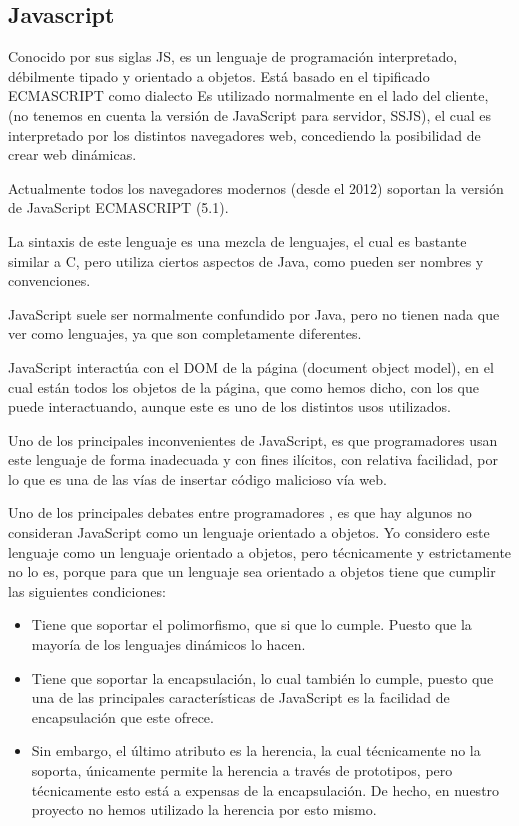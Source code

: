 \subsection{Javascript}

Conocido por sus siglas JS, es un lenguaje de programación interpretado, débilmente tipado y orientado a objetos. Está basado en el tipificado ECMASCRIPT como dialecto
Es utilizado normalmente en el lado del cliente, (no tenemos en cuenta la versión de JavaScript para servidor, SSJS), el cual es interpretado por los distintos navegadores web, concediendo la posibilidad de crear web dinámicas.\cite{JS}

Actualmente todos los navegadores modernos (desde el 2012) soportan la versión de JavaScript ECMASCRIPT (5.1)\cite{ES}.

La sintaxis de este lenguaje es una mezcla de lenguajes, el cual es bastante similar a C, pero utiliza ciertos aspectos de Java, como pueden ser nombres y convenciones.

JavaScript suele ser normalmente confundido por Java, pero no tienen nada que ver como lenguajes, ya que son completamente diferentes.

JavaScript interactúa con el DOM de la página (document object model), en el cual están todos los objetos de la página, que como hemos dicho, con los que puede interactuando, aunque este es uno de los distintos usos utilizados.

Uno de los principales inconvenientes de JavaScript, es que programadores usan este lenguaje de forma inadecuada y con fines ilícitos, con relativa facilidad, por lo que es una de las vías de insertar código malicioso vía web.


Uno de los principales debates entre programadores \cite{JS_OOD}, es que hay algunos no consideran JavaScript como un lenguaje orientado a objetos. Yo considero este lenguaje como un lenguaje orientado a objetos, pero técnicamente y estrictamente no lo es, porque para que un lenguaje sea orientado a objetos tiene que cumplir las siguientes condiciones:
\begin{itemize}
	\item Tiene que soportar el polimorfismo, que si que lo cumple. Puesto que la mayoría de los lenguajes dinámicos lo hacen.

	\item Tiene que soportar la encapsulación, lo cual también lo cumple, puesto que una de las principales características de JavaScript es la facilidad de encapsulación que este ofrece.

	\item Sin embargo, el último atributo es la herencia, la cual técnicamente no la soporta, únicamente permite la herencia a través de prototipos, pero técnicamente esto está a expensas de la encapsulación. De hecho, en nuestro proyecto no hemos utilizado la herencia por esto mismo.

\end{itemize}

